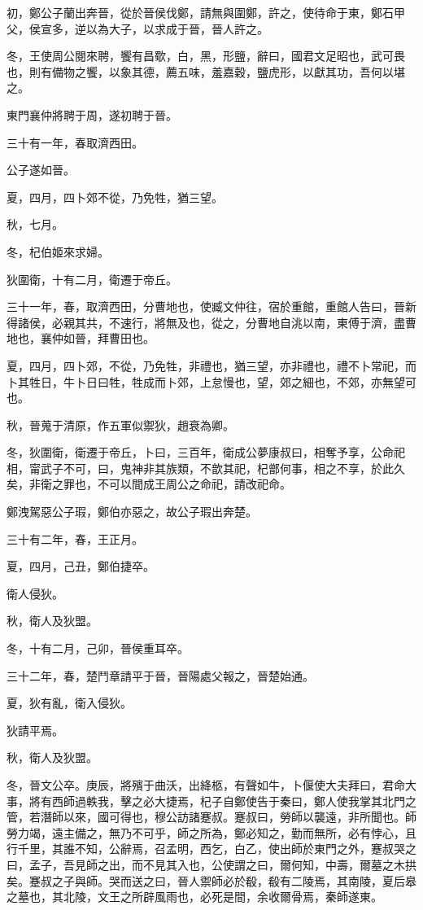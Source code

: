 \begin{pinyinscope}
初，鄭公子蘭出奔晉，從於晉侯伐鄭，請無與圍鄭，許之，使待命于東，鄭石甲父，侯宣多，逆以為大子，以求成于晉，晉人許之。

冬，王使周公閱來聘，饗有昌歜，白，黑，形鹽，辭曰，國君文足昭也，武可畏也，則有備物之饗，以象其德，薦五味，羞嘉穀，鹽虎形，以獻其功，吾何以堪之。

東門襄仲將聘于周，遂初聘于晉。

三十有一年，春取濟西田。

公子遂如晉。

夏，四月，四卜郊不從，乃免牲，猶三望。

秋，七月。

冬，杞伯姬來求婦。

狄圍衛，十有二月，衛遷于帝丘。

三十一年，春，取濟西田，分曹地也，使臧文仲往，宿於重館，重館人告曰，晉新得諸侯，必親其共，不速行，將無及也，從之，分曹地自洮以南，東傅于濟，盡曹地也，襄仲如晉，拜曹田也。

夏，四月，四卜郊，不從，乃免牲，非禮也，猶三望，亦非禮也，禮不卜常祀，而卜其牲日，牛卜日曰牲，牲成而卜郊，上怠慢也，望，郊之細也，不郊，亦無望可也。

秋，晉蒐于清原，作五軍似禦狄，趙衰為卿。

冬，狄圍衛，衛遷于帝丘，卜曰，三百年，衛成公夢康叔曰，相奪予享，公命祀相，甯武子不可，曰，鬼神非其族類，不歆其祀，杞鄫何事，相之不享，於此久矣，非衛之罪也，不可以間成王周公之命祀，請改祀命。

鄭洩駕惡公子瑕，鄭伯亦惡之，故公子瑕出奔楚。

三十有二年，春，王正月。

夏，四月，己丑，鄭伯捷卒。

衛人侵狄。

秋，衛人及狄盟。

冬，十有二月，己卯，晉侯重耳卒。

三十二年，春，楚鬥章請平于晉，晉陽處父報之，晉楚始通。

夏，狄有亂，衛入侵狄。

狄請平焉。

秋，衛人及狄盟。

冬，晉文公卒。庚辰，將殯于曲沃，出絳柩，有聲如牛，卜偃使大夫拜曰，君命大事，將有西師過軼我，擊之必大捷焉，杞子自鄭使告于秦曰，鄭人使我掌其北門之管，若潛師以來，國可得也，穆公訪諸蹇叔。蹇叔曰，勞師以襲遠，非所聞也。師勞力竭，遠主備之，無乃不可乎，師之所為，鄭必知之，勤而無所，必有悖心，且行千里，其誰不知，公辭焉，召孟明，西乞，白乙，使出師於東門之外，蹇叔哭之曰，孟子，吾見師之出，而不見其入也，公使謂之曰，爾何知，中壽，爾墓之木拱矣。蹇叔之子與師。哭而送之曰，晉人禦師必於殽，殽有二陵焉，其南陵，夏后皋之墓也，其北陵，文王之所辟風雨也，必死是間，余收爾骨焉，秦師遂東。


\end{pinyinscope}
